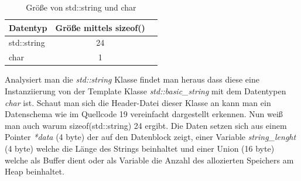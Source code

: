 \documentclass[MES,Master,ngerman]{twbook}%
\begin{document}
\begin{table}[!htb]
	\centering
	\begin{tabular}{| l | c | r |}
		\hline
		\textbf{Datentyp}  & \textbf{Größe mittels sizeof()} \\ \hline
		std::string        & 24 \\ \hline
		char       		   & 1  \\ \hline
	\end{tabular}
	
	\caption{Größe von std::string und char}
	\label{tbl:size_string_char}
	
\end{table}

Analysiert man die \textit{std::string} Klasse findet man heraus dass diese eine Instanziierung von der Template Klasse \textit{std::basic\_string} mit dem Datentypen \textit{char} ist. Schaut man sich die Header-Datei dieser Klasse an kann man ein Datenschema wie im Quellcode 19 vereinfacht dargestellt erkennen. Nun weiß man auch warum sizeof(std::string) 24 ergibt. Die Daten setzen sich aus einem Pointer \textit{*data} (4 byte) der auf den Datenblock zeigt, einer Variable \textit{string\_lenght} (4 byte) welche die Länge des Strings beinhaltet und einer Union (16 byte) welche als Buffer dient oder als Variable die Anzahl des allozierten Speichers am Heap beinhaltet.\newline


\begin{figure}[!htb]
	\centering
	\begin{subfigure}[b]{0.5\textwidth}
		
		\label{lst:9}
	\end{subfigure}
\end{figure}
\end{document}
